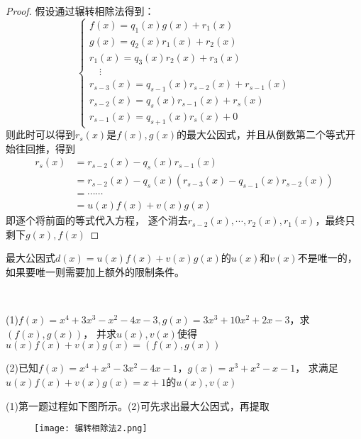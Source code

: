 \begin{proof}
  假设通过辗转相除法得到：
  \begin{equation*}
    \begin{cases}
      f(x) = q_1(x) g(x) + r_1(x)\\
      g(x) = q_2(x)r_1(x) + r_2(x)\\
      r_1(x) = q_3(x) r_2(x) + r_3(x)\\
      \quad \vdots\\
      r_{s-3}(x) = q_{s-1}(x)r_{s-2}(x) + r_{s-1}(x)\\
      r_{s-2}(x) = q_s(x) r_{s-1}(x) + r_s(x)\\
      r_{s-1}(x) = q_{s+1}(x) r_s(x) + 0
    \end{cases}
  \end{equation*}
  则此时可以得到$r_s(x)$是$f(x),g(x)$的最大公因式，并且从倒数第二个等式开始往回推，得到
  \begin{align*}
    r_s(x) &= r_{s-2}(x) - q_s(x)r_{s-1}(x)\\
           &= r_{s-2}(x) - q_s(x) (r_{s-3}(x) - q_{s-1}(x) r_{s-2}(x))\\
    &= \cdots \cdots\\
    &= u(x)f(x) + v(x)g(x)
  \end{align*}
  即逐个将前面的等式代入方程，
  逐个消去$r_{s-2}(x),\cdots,r_2(x),r_1(x)$，最终只剩下$g(x),f(x)$
\end{proof}

\begin{note}
  最大公因式$d(x) = u(x)f(x) + v(x)g(x)$的$u(x)$和$v(x)$不是唯一的，如果要唯一则需要加上额外的限制条件。
\end{note}

~

\begin{exercise}[辗转相除法]
  (1)$f(x) = x^4 + 3x^3 - x^2 - 4x -3, g(x) = 3x^3 + 10x^2 + 2x - 3$，求$(f(x),g(x))$，
  并求$u(x),v(x)$使得$u(x)f(x) + v(x) g(x) = (f(x),g(x))$

  (2)已知$f(x) = x^4 + x^3 - 3x^2 - 4x -1$，$g(x) = x^3 + x^2 - x - 1$，
  求满足$u(x)f(x) + v(x)g(x) = x + 1$的$u(x),v(x)$
\end{exercise}

\begin{solution}
  (1)第一题过程如下图所示。(2)可先求出最大公因式，再提取
\end{solution}

\begin{figure}[htp]
  \centering
  \texttt{[image: 辗转相除法2.png]}
\end{figure}

